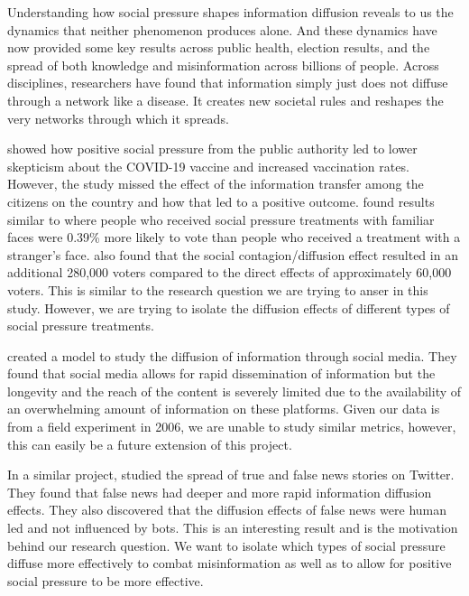 \documentclass[11pt]{article}
\begin{document}
Understanding how social pressure shapes information diffusion reveals to us the dynamics that neither phenomenon produces alone. And these dynamics have now provided some key results across public health, election results, and the spread of both knowledge and misinformation across billions of people. Across disciplines, researchers have found that information simply just does not diffuse through a network like a disease. It creates new societal rules and reshapes the very networks through which it spreads. 

\cite{hong_covid-19_2023} showed how positive social pressure from the public authority led to lower skepticism about the COVID-19 vaccine and increased vaccination rates. However, the study missed the effect of the information transfer among the citizens on the country and how that led to a positive outcome. \cite{bond_61-million-person_2012} found results similar to \cite{gerber_social_2008} where people who received social pressure treatments with familiar faces were 0.39\% more likely to vote than people who received a treatment with a stranger's face. \cite{bond_61-million-person_2012} also found that the social contagion/diffusion effect resulted in an additional 280,000 voters compared to the direct effects of approximately 60,000 voters. This is similar to the research question we are trying to anser in this study. However, we are trying to isolate the diffusion effects of different types of social pressure treatments.

\cite{atienza-barthelemy_modeling_2025} created a model to study the diffusion of information through social media. They found that social media allows for rapid dissemination of information but the longevity and the reach of the content is severely limited due to the availability of an overwhelming amount of information on these platforms. Given our data is from a field experiment in 2006, we are unable to study similar metrics, however, this can easily be a future extension of this project.

In a similar project, \cite{vosoughi_spread_2018} studied the spread of true and false news stories on Twitter. They found that false news had deeper and more rapid information diffusion effects. They also discovered that the diffusion effects of false news were human led and not influenced by bots. This is an interesting result and is the motivation behind our research question. We want to isolate which types of social pressure diffuse more effectively to combat misinformation as well as to allow for positive social pressure to be more effective. 
\end{document}
